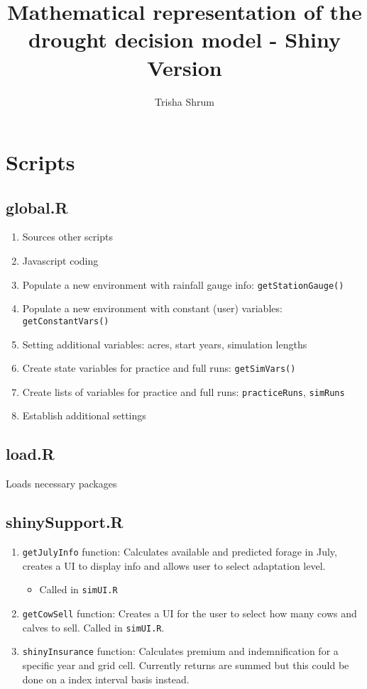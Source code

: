 \documentclass[11pt]{article}
\title{Mathematical representation of the drought decision model - Shiny Version}
\author{Trisha Shrum}
\begin{document}
\maketitle
 
\section{Scripts}

\subsection{global.R}
\begin{enumerate}
\item Sources other scripts
\item Javascript coding
\item Populate a new environment with rainfall gauge info: \verb!getStationGauge()!
\item Populate a new environment with constant (user) variables: \verb!getConstantVars()!
\item Setting additional variables: acres, start years, simulation lengths
\item Create state variables for practice and full runs: \verb!getSimVars()!
\item Create lists of variables for practice and full runs: \verb!practiceRuns!, \verb!simRuns!
\item Establish additional settings
\end{enumerate}  
 
\subsection{load.R}
Loads necessary packages

\subsection{shinySupport.R}
\begin{enumerate}
\item \verb!getJulyInfo! function: Calculates available and predicted forage in July, creates a
    UI to display info and allows user to select adaptation level.
    \begin{itemize}
    \item Called in \verb!simUI.R!
    \end{itemize}
\item \verb!getCowSell! function: Creates a UI for the user to select how many cows and calves to sell. Called in \verb!simUI.R!.
\item \verb!shinyInsurance! function: Calculates premium and indemnification for a specific year and
  grid cell. Currently returns are summed but this could be done on a index interval basis instead.
\end{enumerate}




 
\end{document}

